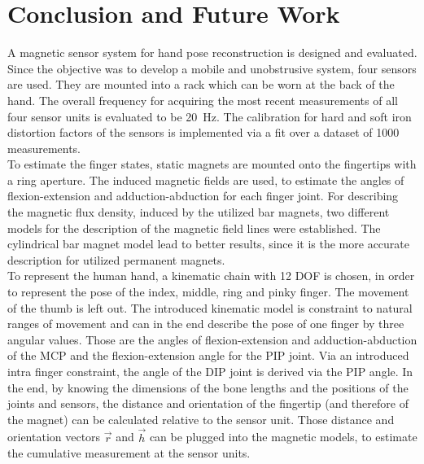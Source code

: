 
\lhead[\chaptername~\thechapter]{\rightmark}


\rhead[\leftmark]{}


\lfoot[\thepage]{}


\cfoot{}


\rfoot[]{\thepage}


\chapter{Conclusion and Future Work}

A magnetic sensor system for hand pose reconstruction is designed and evaluated. 
Since the objective was to develop a mobile and unobstrusive system, four sensors are used. They are mounted into a rack which can be worn at the back of the hand. The overall frequency for acquiring the most recent measurements of all four sensor units is evaluated to be \SI{20}{\Hz}. The calibration for hard and soft iron distortion factors of the sensors is implemented via a fit over a dataset of 1000 measurements.\\
To estimate the finger states, static magnets are mounted onto the fingertips with a ring aperture. The induced magnetic fields are used, to estimate the angles of flexion-extension and adduction-abduction for each finger joint. For describing the magnetic flux density, induced by the utilized bar magnets, two different models for the description of the magnetic field lines were established. The cylindrical bar magnet model lead to better results, since it is the more accurate description for utilized permanent magnets.\\
To represent the human hand, a kinematic chain with 12 \ac{DOF} is chosen, in order to represent the pose of the index, middle, ring and pinky finger. The movement of the thumb is left out. The introduced kinematic model is constraint to natural ranges of movement and can in the end describe the pose of one finger by three angular values. Those are the angles of flexion-extension and adduction-abduction of the \ac{MCP} and the flexion-extension angle for the \ac{PIP} joint. Via an introduced intra finger constraint, the angle of the \ac{DIP} joint is derived via the \ac{PIP} angle. In the end, by knowing the dimensions of the bone lengths and the positions of the joints and sensors, the distance and orientation of the fingertip (and therefore of the magnet) can be calculated relative to the sensor unit. Those distance and orientation vectors $ \vec{r} $ and $ \vec{h} $ can be plugged into the magnetic models, to estimate the cumulative measurement at the sensor units.\\
